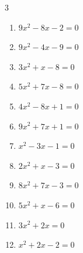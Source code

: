 \begin{multicols}{3}
\begin{enumerate}
\columnbreak %

  \item $9x^{2}-8x-2=0$


  \item $9x^{2}-4x-9=0$


  \item $3x^{2}+x-8=0$


  \item $5x^{2}+7x-8=0$


  \item $4x^{2}-8x+1=0$


  \item $9x^{2}+7x+1=0$


  \item $x^{2}-3x-1=0$


\columnbreak %

\resetques

  \item $2x^{2}+x-3=0$


  \item $8x^{2}+7x-3=0$


  \item $5x^{2}+x-6=0$


  \item $3x^{2}+2x=0$


  \item $x^{2}+2x-2=0$



\end{enumerate}
\end{multicols}
